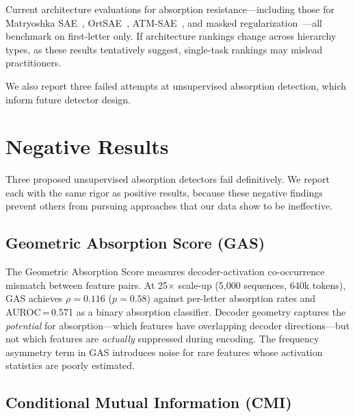 \documentclass{article}
\begin{document}
Current architecture evaluations for absorption resistance---including those for Matryoshka SAE~\citep{bussmann2025matryoshka}, OrtSAE~\citep{korznikov2025ortsae}, ATM-SAE~\citep{li2025atm}, and masked regularization~\citep{narayanaswamy2026masked}---all benchmark on first-letter only. If architecture rankings change across hierarchy types, as these results tentatively suggest, single-task rankings may mislead practitioners.

We also report three failed attempts at unsupervised absorption detection, which inform future detector design.

\section{Negative Results}
\label{sec:negative}

Three proposed unsupervised absorption detectors fail definitively. We report each with the same rigor as positive results, because these negative findings prevent others from pursuing approaches that our data show to be ineffective.

\subsection{Geometric Absorption Score (GAS)}
\label{sec:gas}

The Geometric Absorption Score measures decoder-activation co-occurrence mismatch between feature pairs. At 25$\times$ scale-up (5,000 sequences, 640k tokens), GAS achieves $\rho = 0.116$ ($p = 0.58$) against per-letter absorption rates and AUROC\,=\,0.571 as a binary absorption classifier. Decoder geometry captures the \emph{potential} for absorption---which features have overlapping decoder directions---but not which features are \emph{actually} suppressed during encoding. The frequency asymmetry term in GAS introduces noise for rare features whose activation statistics are poorly estimated.

\subsection{Conditional Mutual Information (CMI)}
\label{sec:cmi}
\end{document}
